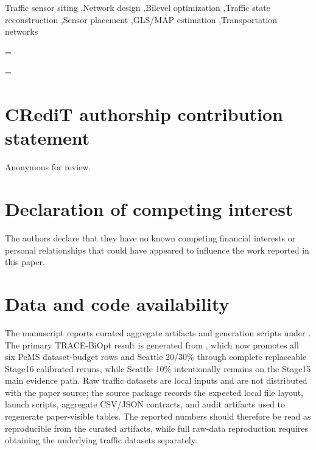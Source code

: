 \documentclass[a4paper,fleqn]{cas-sc}
\begin{document}
\begin{keywords}
Traffic sensor siting \sep Network design \sep Bilevel optimization \sep Traffic state reconstruction \sep Sensor placement \sep GLS/MAP estimation \sep Transportation networks
\end{keywords}

\newdimen\savedhfuzz
\savedhfuzz=\hfuzz
\hfuzz=120pt
\makeatletter
\let\savedHyWarning\Hy@Warning
\def\Hy@Warning#1{}
\makeatother
\maketitle
\makeatletter
\let\Hy@Warning\savedHyWarning
\makeatother
\hfuzz=\savedhfuzz











\section*{CRediT authorship contribution statement}
Anonymous for review.

\section*{Declaration of competing interest}
The authors declare that they have no known competing financial interests or personal relationships that could have appeared to influence the work reported in this paper.

\section*{Data and code availability}
The manuscript reports curated aggregate artifacts and generation scripts under . The primary TRACE-BiOpt result is generated from , which now promotes all six PeMS dataset-budget rows and Seattle 20/30\% through complete replaceable Stage16 calibrated reruns, while Seattle 10\% intentionally remains on the Stage15 main evidence path. Raw traffic datasets are local inputs and are not distributed with the paper source; the source package records the expected local file layout, launch scripts, aggregate CSV/JSON contracts, and audit artifacts used to regenerate paper-visible tables. The reported numbers should therefore be read as reproducible from the curated artifacts, while full raw-data reproduction requires obtaining the underlying traffic datasets separately.
\end{document}
